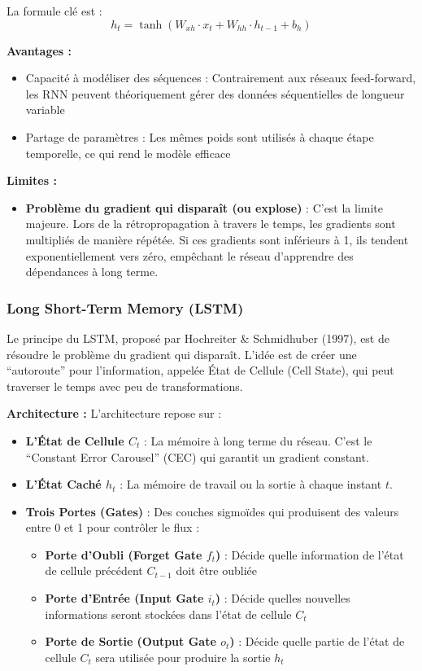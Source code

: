 La formule clé est :
\[
h_t = \tanh(W_{xh} \cdot x_t + W_{hh} \cdot h_{t-1} + b_h)
\]

\textbf{Avantages :}
\begin{itemize}
    \item Capacité à modéliser des séquences : Contrairement aux réseaux feed-forward, les RNN peuvent théoriquement gérer des données séquentielles de longueur variable
    \item Partage de paramètres : Les mêmes poids sont utilisés à chaque étape temporelle, ce qui rend le modèle efficace
\end{itemize}

\textbf{Limites :}
\begin{itemize}
    \item \textbf{Problème du gradient qui disparaît (ou explose)} : C'est la limite majeure. Lors de la rétropropagation à travers le temps, les gradients sont multipliés de manière répétée. Si ces gradients sont inférieurs à 1, ils tendent exponentiellement vers zéro, empêchant le réseau d'apprendre des dépendances à long terme.
\end{itemize}

\subsubsection{Long Short-Term Memory (LSTM)}

Le principe du LSTM, proposé par Hochreiter \& Schmidhuber (1997), est de résoudre le problème du gradient qui disparaît. L'idée est de créer une \enquote{autoroute} pour l'information, appelée État de Cellule (Cell State), qui peut traverser le temps avec peu de transformations.

\textbf{Architecture :}
L'architecture repose sur :
\begin{itemize}
    \item \textbf{L'État de Cellule $C_t$} : La mémoire à long terme du réseau. C'est le \enquote{Constant Error Carousel} (CEC) qui garantit un gradient constant.
    
    \item \textbf{L'État Caché $h_t$} : La mémoire de travail ou la sortie à chaque instant $t$.
    
    \item \textbf{Trois Portes (Gates)} : Des couches sigmoïdes qui produisent des valeurs entre 0 et 1 pour contrôler le flux :
    \begin{itemize}
        \item \textbf{Porte d'Oubli (Forget Gate $f_t$)} : Décide quelle information de l'état de cellule précédent $C_{t-1}$ doit être oubliée
        \item \textbf{Porte d'Entrée (Input Gate $i_t$)} : Décide quelles nouvelles informations seront stockées dans l'état de cellule $C_t$
        \item \textbf{Porte de Sortie (Output Gate $o_t$)} : Décide quelle partie de l'état de cellule $C_t$ sera utilisée pour produire la sortie $h_t$
    \end{itemize}
\end{itemize}

